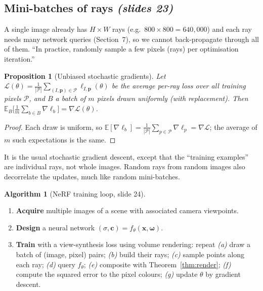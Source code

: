 \documentclass[11pt,a4paper]{article}
\newcommand{\sref}[1]{\texorpdfstring{\emph{(slides #1)}}{(slides #1)}}
\newcommand{\E}{\mathbb{E}}
\newcommand{\om}{\boldsymbol{\omega}}
\newcommand{\cc}{\boldsymbol{c}}
\newcommand{\xx}{\boldsymbol{x}}
\theoremstyle{definition}
\newtheorem{algorithm}{Algorithm}[section]
\theoremstyle{plain}
\newtheorem{proposition}[definition]{Proposition}
\theoremstyle{remark}
\begin{document}
\subsection{Mini-batches of rays \sref{23}}

A single image already has $H\times W$ rays (e.g.\ $800\times800=640{,}000$) and each ray needs many network queries (Section~7), so we cannot back-propagate through all of them. ``In practice, randomly sample a few pixels (rays) per optimisation iteration.''

\begin{proposition}[Unbiased stochastic gradients]
Let $\mathcal L(\theta)=\frac1{|\mathcal P|}\sum_{(I,\boldsymbol p)\in\mathcal P}\ell_{I,\boldsymbol p}(\theta)$ be the average per-ray loss over all training pixels $\mathcal P$, and $B$ a batch of $m$ pixels drawn uniformly (with replacement). Then $\E_B\big[\frac1m\sum_{b\in B}\nabla\ell_b\big]=\nabla\mathcal L(\theta)$.
\end{proposition}
\begin{proof}
Each draw is uniform, so $\E[\nabla\ell_b]=\frac1{|\mathcal P|}\sum_{p\in\mathcal P}\nabla\ell_p=\nabla\mathcal L$; the average of $m$ such expectations is the same.
\end{proof}
\begin{intuition}
It is the usual stochastic gradient descent, except that the ``training examples'' are individual rays, not whole images. Random rays from random images also decorrelate the updates, much like random mini-batches.
\end{intuition}

\begin{algorithm}[NeRF training loop, slide 24]\label{alg:train}
\begin{enumerate}[nosep]
\item \textbf{Acquire} multiple images of a scene with associated camera viewpoints.
\item \textbf{Design} a neural network $(\sigma,\cc)=f_\theta(\xx,\om)$.
\item \textbf{Train} with a view-synthesis loss using volume rendering: repeat \emph{(a)} draw a batch of (image, pixel) pairs; \emph{(b)} build their rays; \emph{(c)} sample points along each ray; \emph{(d)} query $f_\theta$; \emph{(e)} composite with Theorem~\ref{thm:render}; \emph{(f)} compute the squared error to the pixel colours; \emph{(g)} update $\theta$ by gradient descent.
\end{enumerate}
\end{algorithm}
\end{document}
